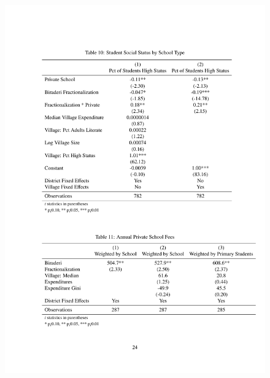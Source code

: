 \documentclass{beamer}
\begin{document}
\begin{frame}{}
	\begin{figure}[htb]
		\begin{center}
		\includegraphics[scale=0.7]{tables/social_status_type.pdf}
		\end{center}
	\end{figure}
\end{frame}
\end{document}
